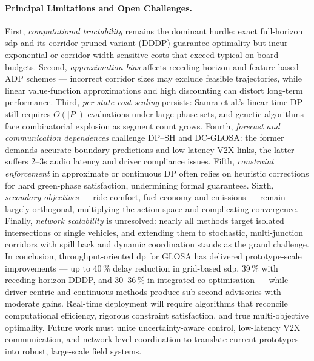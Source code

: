\paragraph{Principal Limitations and Open Challenges.} 
First, \emph{computational tractability} remains the dominant hurdle: exact full-horizon \ac{sdp} and its corridor-pruned variant (DDDP) guarantee optimality but incur exponential or corridor-width-sensitive costs that exceed typical on-board budgets. Second, \emph{approximation bias} affects receding-horizon and feature-based ADP schemes --- incorrect corridor sizes may exclude feasible trajectories, while linear value‐function approximations and high discounting can distort long-term performance. Third, \emph{per-state cost scaling} persists: Samra et al.’s linear-time DP still requires $O(|P|)$ evaluations under large phase sets, and genetic algorithms face combinatorial explosion as segment count grows. Fourth, \emph{forecast and communication dependences} challenge DP–SH and DC-GLOSA: the former demands accurate boundary predictions and low-latency V2X links, the latter suffers 2–3s audio latency and driver compliance issues. Fifth, \emph{constraint enforcement} in approximate or continuous DP often relies on heuristic corrections for hard green-phase satisfaction, undermining formal guarantees. Sixth, \emph{secondary objectives} --- ride comfort, fuel economy and emissions --- remain largely orthogonal, multiplying the action space and complicating convergence. Finally, \emph{network scalability} is unresolved: nearly all methods target isolated intersections or single vehicles, and extending them to stochastic, multi-junction corridors with spill back and dynamic coordination stands as the grand challenge.
\mynewline
In conclusion, throughput-oriented \ac{dp} for GLOSA has delivered prototype-scale improvements --- up to 40\,\% delay reduction in grid-based \ac{sdp}, 39\,\% with receding-horizon DDDP, and 30–36\,\% in integrated co-optimisation --- while driver-centric and continuous methods produce sub-second advisories with moderate gains. Real-time deployment will require algorithms that reconcile computational efficiency, rigorous constraint satisfaction, and true multi-objective optimality. Future work must unite uncertainty-aware control, low-latency V2X communication, and network-level coordination to translate current prototypes into robust, large-scale field systems.
